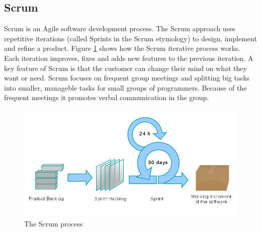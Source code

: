 \subsection{Scrum}
Scrum is an Agile software development process. The Scrum approach uses repetitive iterations (called
Sprints in the Scrum etymology) to design, implement and refine a product. Figure \ref{fig:designmodel-scrum} shows
how the Scrum iterative process works. Each iteration improves, fixes and adds new features to the previous iteration.
A key feature of Scrum is that the customer can change their mind on what they want or need. Scrum focuses on frequent 
group meetings and splitting big tasks into smaller, manageble tasks for small groups of programmers. Because of the
frequent meetings it promotes verbal communication in the group.
\begin{figure}[h!]
\centering \includegraphics[scale=0.4]{img/designmodel-scrum} \caption{The Scrum process~\cite{link:wiki}}
\label{fig:designmodel-scrum}
\end{figure}

